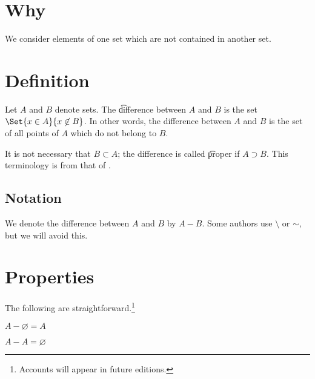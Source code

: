 
\section*{Why}

We consider elements of one set which are not contained in another set.

\section*{Definition}

Let $A$ and $B$ denote sets.
The \t{difference} between $A$ and $B$ is the set $\Set{x \in A}{x \not\in B}$.
In other words, the difference between $A$ and $B$ is the set of all points of $A$ which do not belong to $B$.

It is not necessary that $B \subset A$; the difference is called \t{proper} if $A \supset B$.
This terminology is from that of .

\subsection*{Notation}

We denote the difference between $A$ and $B$ by $A - B$.
Some authors use $\setminus$ or $\sim$, but we will avoid this.


\section*{Properties}

The following are straightforward.\footnote{Accounts will appear in future editions.}

\begin{proposition}
$A - \varnothing = A$
\end{proposition}

\begin{proposition}
$A - A = \varnothing$
\end{proposition}

\blankpage